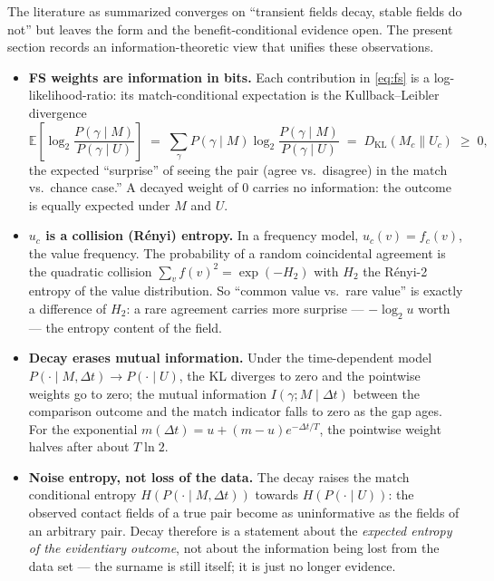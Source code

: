 \documentclass[11pt]{article}
\newcommand{\dt}{\Delta t}
\begin{document}
The literature as summarized converges on ``transient fields decay, stable fields do not''
but leaves the form and the benefit-conditional evidence open. The present section records an
information-theoretic view that unifies these observations.

\begin{itemize}[leftmargin=*]
  \item \textbf{FS weights are information in bits.} Each contribution in
        \eqref{eq:fs} is a log-likelihood-ratio: its match-conditional expectation is the
        Kullback--Leibler divergence
        \begin{equation}
          \mathbb{E}\!\left[\log_2 \frac{P(\gamma\mid M)}{P(\gamma\mid U)} \right]
          \;=\; \sum_\gamma P(\gamma\mid M)\log_2
            \frac{P(\gamma\mid M)}{P(\gamma\mid U)}
          \;=\; D_{\mathrm{KL}}(M_c \| U_c)
          \;\ge\;0,
        \end{equation}
        the expected ``surprise'' of seeing the pair (agree vs.\ disagree) in the match vs.\
        chance case.'' A decayed weight of 0 carries no information: the outcome is
        equally expected under $M$ and $U$.
  \item \textbf{$u_c$ is a collision (R\'enyi) entropy.} In a frequency model,
        $u_c(v) = f_c(v)$, the value frequency. The probability of a random coincidental
        agreement is the quadratic collision
        $\sum_v f(v)^2 = \exp(-H_2)$ with $H_2$ the R\'enyi-2 entropy of the value
        distribution. So ``common value vs.\ rare value'' is exactly a difference of
        $H_2$: a rare agreement carries more surprise --- $-\log_2 u$ worth --- the
        entropy content of the field.
  \item \textbf{Decay erases mutual information.} Under the time-dependent model
        $P(\cdot\mid M,\dt)\to P(\cdot\mid U)$, the KL diverges to zero and the pointwise
        weights go to zero; the mutual information
        $I(\gamma; M \mid \dt)$ between the comparison outcome and the match
        indicator falls to zero as the gap ages. For the exponential
        $m(\dt)=u+(m-u)e^{-\dt/T}$, the pointwise weight halves after about $T\ln 2$.
  \item \textbf{Noise entropy, not loss of the data.} The decay raises the
        match conditional entropy $H(P(\cdot \mid M,\dt))$ towards
        $H(P(\cdot \mid U))$: the observed contact fields of a true pair become as
        uninformative as the fields of an arbitrary pair. Decay therefore is a statement
        about the \emph{expected entropy of the evidentiary outcome}, not about the
        information being lost from the data set --- the surname is still itself; it is
        just no longer evidence.
\end{itemize}
\end{document}
